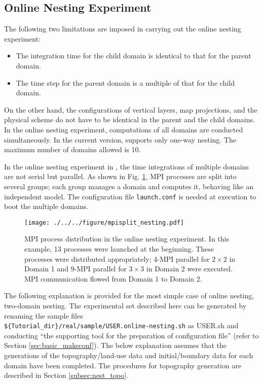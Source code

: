 \subsection{Online Nesting Experiment} \label{subsec:nest_online}

The following two limitations are imposed in carrying out the online nesting experiment:
\begin{itemize}
\item The integration time for the child domain is identical to that for the parent domain.
\item The time step for the parent domain is a multiple of that for the child domain.
\end{itemize}
On the other hand, the configurations of vertical layers, map projections, and the physical scheme do not have to be identical in the parent and the child domains. In the online nesting experiment, computations of all domains are conducted simultaneously. In the current version, \scalerm supports only one-way nesting. The maximum number of domains allowed is 10.

In the online nesting experiment in \scalerm, the time integrations of multiple domains are not serial but parallel. As shown in Fig. \ref{fig_mpisplit}, MPI processes are split into several groups; each group manages a domain and computes it, behaving like an independent model. The configuration file \verb|launch.conf| is needed at execution to boot the multiple domains.

\begin{figure}[tbh]
\begin{center}
  \texttt{[image: ./../../figure/mpisplit\_nesting.pdf]}\\
  \caption{ MPI process distribution in the online nesting experiment. In this example,   13 processes were launched at the beginning. These processes were distributed appropriately;     4-MPI parallel for $2 \times 2$ in Domain 1 and 9-MPI parallel for $3 \times 3$ in Domain 2 were executed.     MPI communication flowed from Domain 1 to Domain 2.
  }
  \label{fig_mpisplit}
\end{center}
\end{figure}

The following explanation is provided for the most simple case of online nesting, two-domain nesting.
The experimental set described here can be generated by renaming the sample files \\
\verb|${Tutorial_dir}/real/sample/USER.online-nesting.sh|
as USER.sh and conducting ``the supporting tool for the preparation of configuration file'' (refer to Section \ref{sec:basic_makeconf}).
The below explanation assumes that the generations of the topography/land-use data and initial/boundary data for each domain have been completed. The procedures for topography generation are described in Section \ref{subsec:nest_topo}.


